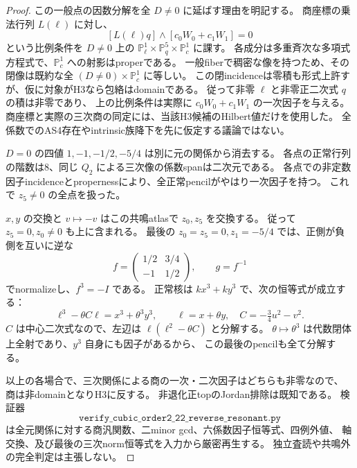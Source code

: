 \begin{proof}
この一般点の因数分解を全 $D\ne0$ に延ばす理由を明記する。
商座標の乗法行列 $L(\ell)$ に対し、
\[
 [L(\ell)q]\wedge[c_0W_0+c_1W_1]=0
\]
という比例条件を
$D\ne0$ 上の $\mathbb P^1_{\ell}\times\mathbb P^5_q\times\mathbb P^1_c$ に課す。
各成分は多重斉次な多項式方程式で、$\mathbb P^1_c$ への射影はproperである。
一般fiberで稠密な像を持つため、その閉像は既約な全
$(D\ne0)\times\mathbb P^1_c$ に等しい。
この閉incidenceは零積も形式上許すが、仮に対象がH3なら包絡はdomainである。
従って非零 $\ell$ と非零正二次式 $q$ の積は非零であり、
上の比例条件は実際に $c_0W_0+c_1W_1$ の一次因子を与える。
商座標と実際の三次商の同定には、当該H3候補のHilbert値だけを使用した。
全係数でのAS4存在やintrinsic族降下を先に仮定する議論ではない。

$D=0$ の四値 $1,-1,-1/2,-5/4$ は別に元の関係から消去する。
各点の正常行列の階数は8、同じ $Q_2$ による三次像の係数spanは二次元である。
各点での非定数因子incidenceとpropernessにより、全正常pencilがやはり一次因子を持つ。
これで $z_5\ne0$ の全点を扱った。

$x,y$ の交換と $v\mapsto-v$ はこの共鳴atlasで $z_0,z_5$ を交換する。
従って $z_5=0,z_0\ne0$ も上に含まれる。
最後の $z_0=z_5=0,z_1=-5/4$ では、正側が負側を互いに逆な
\[
 f=\begin{pmatrix}1/2&3/4\\-1&1/2\end{pmatrix},\qquad g=f^{-1}
\]
でnormalizeし、$f^3=-I$ である。
正常核は $kx^3+ky^3$ で、次の恒等式が成立する：
\[
 \ell^3-\theta C\ell=x^3+\theta^3y^3,\qquad
 \ell=x+\theta y,\quad C=-\tfrac34u^2-v^2.
\]
$C$ は中心二次式なので、左辺は $\ell(\ell^2-\theta C)$ と分解する。
$\theta\mapsto\theta^3$ は代数閉体上全射であり、$y^3$ 自身にも因子があるから、
この最後のpencilも全て分解する。

以上の各場合で、三次関係による商の一次・二次因子はどちらも非零なので、
商は非domainとなりH3に反する。
非退化正topのJordan排除は既知である。
検証器
\[
\texttt{verify\_cubic\_order2\_22\_reverse\_resonant.py}
\]
は全元関係に対する商汎関数、二minor gcd、六係数因子恒等式、四例外値、
軸交換、及び最後の三次norm恒等式を入力から厳密再生する。
独立査読や共鳴外の完全判定は主張しない。
\end{proof}
